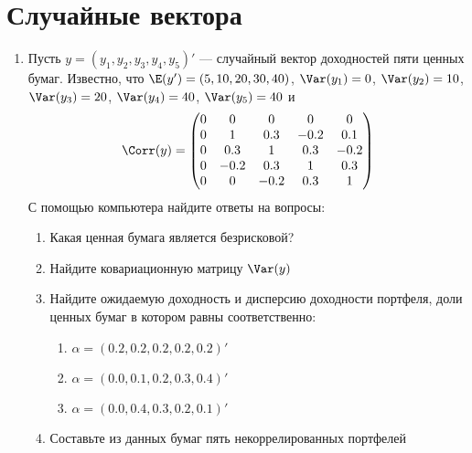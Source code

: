 \section{Случайные вектора}

\begin{enumerate}
\item Пусть $y=(y_1, y_2, y_3, y_4, y_5)'$ --- случайный вектор доходностей пяти ценных бумаг. Известно, что $\E(y')=(5, 10, 20, 30, 40)$, $\Var(y_1)=0$, $\Var(y_2)=10$, $\Var(y_3)=20$, $\Var(y_4)=40$, $\Var(y_5)=40$ и
\[
\Corr(y)=\begin{pmatrix}
0 & 0 & 0 & 0 & 0 \\
0 & 1 & 0.3 & -0.2 & 0.1 \\
0 & 0.3 & 1 & 0.3 & -0.2 \\
0 & -0.2 & 0.3& 1 & 0.3 \\
0 & 0 & -0.2 & 0.3 & 1 
\end{pmatrix}
\]
С помощью компьютера найдите ответы на вопросы:
\begin{enumerate}
\item Какая ценная бумага является безрисковой?
\item Найдите ковариационную матрицу $\Var(y)$
\item Найдите ожидаемую доходность и дисперсию доходности портфеля, доли ценных бумаг в котором равны соответственно:
\begin{enumerate}
\item $\alpha=(0.2, 0.2, 0.2, 0.2, 0.2)'$
\item $\alpha=(0.0, 0.1, 0.2, 0.3, 0.4)'$
\item $\alpha=(0.0, 0.4, 0.3, 0.2, 0.1)'$
\end{enumerate}
\item Составьте из данных бумаг пять некоррелированных портфелей 
\end{enumerate}



\end{enumerate}
